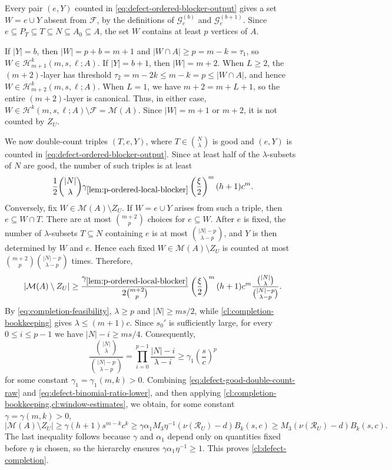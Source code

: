 \documentclass[10pt,a4paper]{article}
\numberwithin{equation}{section}
\theoremstyle{definition}
\newcommand{\F}{\mathcal F}
\newcommand{\G}{\mathcal G}
\newcommand{\M}{\mathcal M}
\newcommand{\Rcal}{\mathcal R}
\begin{document}
Every pair $(e,Y)$ counted in \eqref{eq:defect-ordered-blocker-output} gives a set $W=e\cup Y$ absent from $\F$, by the definitions of $\G_e^{(b)}$ and $\G_e^{(b+1)}$.
Since $e\subseteq P_T\subseteq T\subseteq N\subseteq A_0\subseteq A$, the set $W$ contains at least $p$ vertices of $A$.

If $|Y|=b$, then $|W|=p+b=m+1$ and $|W\cap A|\ge p=m-k=\tau_1$, so $W\in\mathcal H^k_{m+1}(m,s,\ell;A)$.
If $|Y|=b+1$, then $|W|=m+2$.
When $L\ge 2$, the $(m+2)$-layer has threshold $\tau_2=m-2k\le m-k=p\le |W\cap A|$, and hence $W\in\mathcal H^k_{m+2}(m,s,\ell;A)$.
When $L=1$, we have $m+2=m+L+1$, so the entire $(m+2)$-layer is
canonical. Thus, in either case, $W\in
        \mathcal H^k(m,s,\ell;A)\setminus\mathcal F
        =\mathcal M(A)$.
Since $|W|=m+1$ or $m+2$, it is not counted by $Z_U$.

We now double-count triples $(T,e,Y)$, where $T\in\binom N\lambda$ is good and $(e,Y)$ is counted in \eqref{eq:defect-ordered-blocker-output}.
Since at least half of the $\lambda$-subsets of $N$ are good, the number of such triples is at least
\[
        \frac12\binom{|N|}{\lambda}
        \gamma_{\ref{lem:p-ordered-local-blocker}}
        \left(\frac\xi2\right)^m
        (h+1)c^m.
\]
Conversely, fix $W\in\M(A)\setminus Z_U$.
If $W=e\cup Y$ arises from such a triple, then $e\subseteq W\cap T$.
There are at most $\binom{m+2}p$ choices for $e\subseteq W$.
After $e$ is fixed, the number of $\lambda$-subsets $T\subseteq N$ containing $e$ is at most $\binom{|N|-p}{\lambda-p}$, and $Y$ is then determined by $W$ and $e$.
Hence each fixed $W\in\M(A)\setminus Z_U$ is counted at most $\binom{m+2}p\binom{|N|-p}{\lambda-p}$ times.
Therefore,
\begin{equation}\label{eq:defect-good-double-count-raw}
        |\M(A)\setminus Z_U|
        \ge
        \frac{\gamma_{\ref{lem:p-ordered-local-blocker}}}
        {2\binom{m+2}{p}}
        \left(\frac\xi2\right)^m
        (h+1)c^m
        \frac{\binom{|N|}{\lambda}}
        {\binom{|N|-p}{\lambda-p}}.
\end{equation}
By \eqref{eq:completion-feasibility}, $\lambda\ge p$ and
$|N|\ge ms/2$, while \cref{cl:completion-bookkeeping} gives
$\lambda\le(m+1)c$.  Since $s_0'$ is sufficiently large, for every
$0\le i\le p-1$ we have $|N|-i\ge ms/4$.  Consequently,
\begin{equation}\label{eq:defect-binomial-ratio-lower}
        \frac{\binom{|N|}{\lambda}}
        {\binom{|N|-p}{\lambda-p}}
        =
        \prod_{i=0}^{p-1}\frac{|N|-i}{\lambda-i}
        \ge
        \gamma_1\left(\frac sc\right)^p
\end{equation}
for some constant $\gamma_1=\gamma_1(m,k)>0$.
Combining \eqref{eq:defect-good-double-count-raw} and
\eqref{eq:defect-binomial-ratio-lower}, and then applying
\cref{cl:completion-bookkeeping,cl:window-estimates}, we obtain, for some
constant $\gamma=\gamma(m,k)>0$,
\[
        |\M(A)\setminus Z_U|\ge \gamma(h+1)s^{m-k}c^k\ge \gamma\alpha_1M_3\eta^{-1}
        (\nu(\Rcal_U)-d)B_k(s,c)  \ge M_3(\nu(\Rcal_U)-d)B_k(s,c).
\]
The last inequality follows because $\gamma$ and $\alpha_1$ depend only
on quantities fixed before $\eta$ is chosen, so the hierarchy ensures
$\gamma\alpha_1\eta^{-1}\ge1$.
This proves \cref{cl:defect-completion}.
\end{document}
